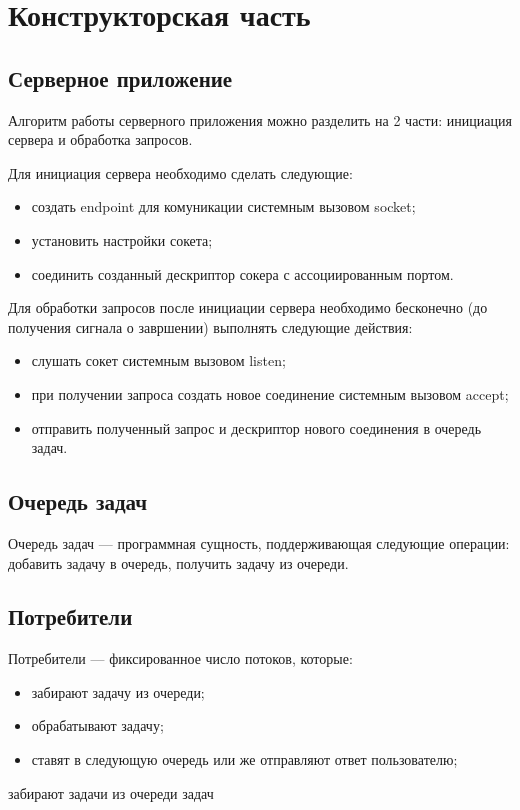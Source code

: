 \chapter{Конструкторская часть}

\section{Серверное приложение}

Алгоритм работы серверного приложения можно разделить на 2 части: инициация сервера и обработка запросов.

Для инициация сервера необходимо сделать следующие:

\begin{itemize}
	\item создать endpoint для комуникации системным вызовом socket;
	\item установить настройки сокета;
	\item соединить созданный дескриптор сокера с ассоциированным портом.
\end{itemize}

Для обработки запросов после инициации сервера необходимо бесконечно (до получения сигнала о завршении) выполнять следующие действия:

\begin{itemize}
	\item слушать сокет системным вызовом listen;
	\item при получении запроса создать новое соединение системным вызовом accept;
	\item отправить полученный запрос и дескриптор нового соединения в очередь задач.
\end{itemize}

\section{Очередь задач}

Очередь задач — программная сущность, поддерживающая следующие операции: добавить задачу в очередь, получить задачу из очереди.

\section{Потребители}

Потребители — фиксированное число потоков, которые:
\begin{itemize}
	\item забирают задачу из очереди;
	\item обрабатывают задачу;
	\item ставят в следующую очередь или же отправляют ответ пользователю;
\end{itemize}
 забирают задачи из очереди задач



